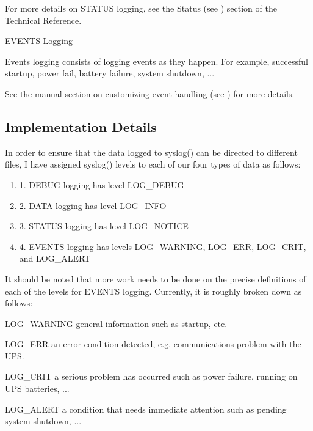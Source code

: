 {{{{{{{For more details on STATUS logging, see the Status (see 
) section of
the Technical Reference. 

\small{EVENTS Logging}

Events logging consists of logging events as they happen. For example,
successful startup, power fail, battery failure, system shutdown, ...  

See the manual section on customizing event handling (see 
) for
more details. 

\label{Implementation-Details}

\subsection*{Implementation Details}

In order to ensure that the data logged to syslog() can be directed to
different files, I have assigned syslog() levels to each of our four types of
data as follows:  

\begin{enumerate}
\item 1. DEBUG logging has level LOG\_DEBUG  
\item 2. DATA logging has level LOG\_INFO  
\item 3. STATUS logging has level LOG\_NOTICE  
\item 4. EVENTS logging has levels LOG\_WARNING, LOG\_ERR, LOG\_CRIT, and
   LOG\_ALERT  
   \end{enumerate}

It should be noted that more work needs to be done on the precise definitions
of each of the levels for EVENTS logging. Currently, it is roughly broken down
as follows:  

LOG\_WARNING general information such as startup, etc.  

LOG\_ERR an error condition detected, e.g. communications problem with the
UPS.  

LOG\_CRIT a serious problem has occurred such as power failure, running on UPS
batteries, ...  

LOG\_ALERT a condition that needs immediate attention such as pending system
shutdown, ...  

}}}}}}}

